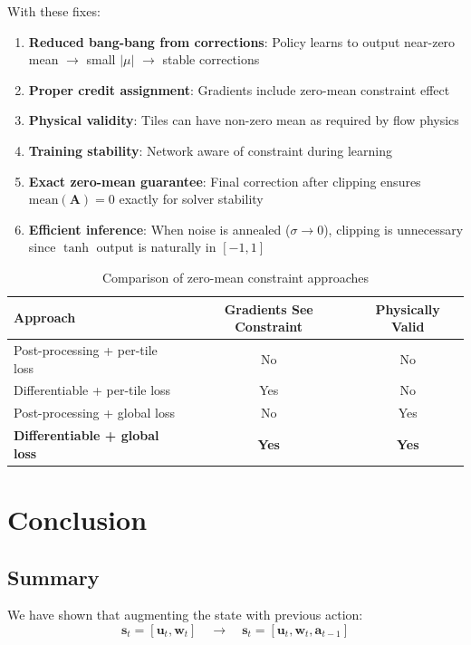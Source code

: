 \documentclass[11pt,a4paper]{article}
\theoremstyle{definition}
\begin{document}
With these fixes:
\begin{enumerate}
    \item \textbf{Reduced bang-bang from corrections}: Policy learns to output near-zero mean $\to$ small $|\mu|$ $\to$ stable corrections
    \item \textbf{Proper credit assignment}: Gradients include zero-mean constraint effect
    \item \textbf{Physical validity}: Tiles can have non-zero mean as required by flow physics
    \item \textbf{Training stability}: Network aware of constraint during learning
    \item \textbf{Exact zero-mean guarantee}: Final correction after clipping ensures $\text{mean}(\mathbf{A}) = 0$ exactly for solver stability
    \item \textbf{Efficient inference}: When noise is annealed ($\sigma \to 0$), clipping is unnecessary since $\tanh$ output is naturally in $[-1, 1]$
\end{enumerate}

\begin{table}[h]
\centering
\begin{tabular}{lcc}
\toprule
Approach & Gradients See Constraint & Physically Valid \\
\midrule
Post-processing + per-tile loss & No & No \\
Differentiable + per-tile loss & Yes & No \\
Post-processing + global loss & No & Yes \\
\textbf{Differentiable + global loss} & \textbf{Yes} & \textbf{Yes} \\
\bottomrule
\end{tabular}
\caption{Comparison of zero-mean constraint approaches}
\end{table}

\section{Conclusion}

\subsection{Summary}

We have shown that augmenting the state with previous action:
\begin{equation}
    \mathbf{s}_t = [\mathbf{u}_t, \mathbf{w}_t] \quad \to \quad \mathbf{s}_t = [\mathbf{u}_t, \mathbf{w}_t, \mathbf{a}_{t-1}]
\end{equation}
\end{document}
